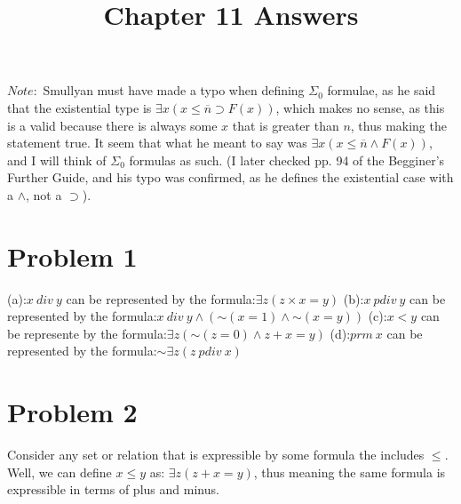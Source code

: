 \documentclass{article}
\title{Chapter 11 Answers}
\newcommand*{\oldneg}{\mathord{\sim}}
\theoremstyle{definition}
\begin{document}
\maketitle
$Note:$ Smullyan must have made a typo when defining $\Sigma_0$ formulae, as he said that the existential type is $\exists x(x\le \overline n\supset F(x))$, which makes 
no sense, as this is a valid because there is always some $x$ that is greater than $n$, thus making the statement true. It seem that what he meant to say was 
$\exists x(x\le \overline n\wedge F(x))$, and I will think of $\Sigma_0$ formulas as such. (I later checked pp. 94 of the Begginer's Further Guide, and his typo was confirmed, 
as he defines the existential case with a $\wedge$, not a $\supset$).
\section*{Problem 1}
(a):\newline $x\ div\ y$ can be represented by the formula:\newline $\exists z(z\times x=y)$\newline
(b):\newline $x\ pdiv\ y$ can be represented by the formula:\newline $x\ div\ y\wedge (\oldneg (x=1) \wedge \oldneg (x=y))$\newline
(c):\newline $x<y$ can be represente by the formula:\newline $\exists z(\oldneg (z=0)\wedge z+x=y)$\newline
(d):\newline $prm\ x$ can be represented by the formula:\newline $\oldneg \exists z(z\ pdiv\ x)$
\section*{Problem 2}
Consider any set or relation that is expressible by some formula the includes $\le$. Well, we can define $x\le y$ as: $\exists z(z+x=y)$, thus meaning
 the same formula is expressible in terms of plus and minus.
\end{document}
